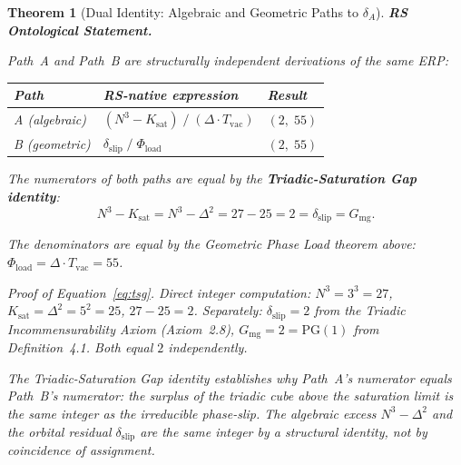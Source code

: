 \documentclass[11pt, letterpaper]{article}
\theoremstyle{definition}
\theoremstyle{plain}
\newtheorem{theorem}{Theorem}[section]
\begin{document}
\begin{theorem}[Dual Identity: Algebraic and Geometric Paths to $\delta_A$]

\textbf{RS Ontological Statement.}

Path~A and Path~B are structurally independent derivations of the same ERP:

\medskip
\begin{center}
\begin{tabular}{lll}
\hline
Path & RS-native expression & Result \\
\hline
A (algebraic) & $(N^3 - K_\mathrm{sat})\;/\;(\Delta \cdot T_\mathrm{vac})$ & $(2,\;55)$ \\
B (geometric) & $\delta_\mathrm{slip}\;/\;\Phi_\mathrm{load}$ & $(2,\;55)$ \\
\hline
\end{tabular}
\end{center}

\medskip
The numerators of both paths are equal by the
\textbf{Triadic-Saturation Gap identity}:
\begin{equation}
    N^3 - K_\mathrm{sat} = N^3 - \Delta^2 = 27 - 25 = 2 = \delta_\mathrm{slip} = G_\mathrm{mg}.
    \label{eq:tsg}
\end{equation}

The denominators are equal by the Geometric Phase Load theorem above:
$\Phi_\mathrm{load} = \Delta \cdot T_\mathrm{vac} = 55$.

\textit{Proof of Equation~\eqref{eq:tsg}.} Direct integer computation:
$N^3 = 3^3 = 27$, $K_\mathrm{sat} = \Delta^2 = 5^2 = 25$, $27 - 25 = 2$.
Separately: $\delta_\mathrm{slip} = 2$ from the Triadic Incommensurability Axiom
(Axiom~2.8), $G_\mathrm{mg} = 2 = \mathrm{PG}(1)$ from Definition~4.1. Both equal $2$
independently.

The Triadic-Saturation Gap identity establishes why Path~A's numerator equals
Path~B's numerator: the surplus of the triadic cube above the saturation limit is
the same integer as the irreducible phase-slip. The algebraic excess $N^3 - \Delta^2$
and the orbital residual $\delta_\mathrm{slip}$ are the same integer by a structural
identity, not by coincidence of assignment.
\end{theorem}
\end{document}
